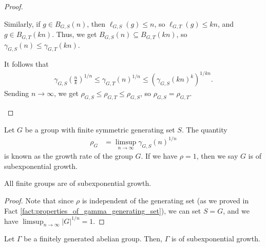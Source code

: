 \documentclass[10pt]{mypackage2}
\begin{document}
\begin{proof}
\begin{enumerate}[(1)]
      Similarly, if $g\in B_{G,S}\left(n\right)$, then $\ell_{G,S}\left(g\right)\leq n$, so $\ell_{G,T}\left(g\right) \leq kn$, and $g\in B_{G,T}\left(kn\right)$. Thus, we get $B_{G,S}\left(n\right)\subseteq B_{G,T}\left(kn\right)$, so $\gamma_{G,S}\left(n\right)\leq \gamma_{G,T}\left(kn\right)$.\newline

      It follows that
      \begin{align*}
        \gamma_{G,S}\left(\frac{n}{k}\right)^{1/n} \leq \gamma_{G,T}\left(n\right)^{1/n} \leq \left(\gamma_{G,S}\left(kn\right)^{k}\right)^{1/kn}.
      \end{align*}
      Sending $n\rightarrow\infty$, we get $\rho_{G,S}\leq \rho_{G,T}\leq \rho_{G,S}$, so $\rho_{G,S} = \rho_{G,T}$.
  \end{enumerate}
\end{proof}
\begin{definition}
  Let $G$ be a group with finite symmetric generating set $S$. The quantity
  \begin{align*}
    \rho_{G} &= \limsup_{n\rightarrow\infty}\gamma_{G,S}\left(n\right)^{1/n}
  \end{align*}
  is known as the growth rate of the group $G$. If we have $\rho = 1$, then we say $G$ is of subexponential growth.
\end{definition}
\begin{fact}\label{fact:finite_groups_subexponential_growth}
  All finite groups are of subexponential growth.
\end{fact}
\begin{proof}
Note that since $\rho$ is independent of the generating set (as we proved in Fact \ref{fact:properties_of_gamma_generating_set}), we can set $S = G$, and we have $\limsup_{n\rightarrow\infty} \left\vert G \right\vert^{1/n} = 1$.
\end{proof}
\begin{fact}\label{fact:finitely_generated_abelian_groups_subexponential_growth}
  Let $\Gamma$ be a finitely generated abelian group. Then, $\Gamma$ is of subexponential growth.
\end{fact}
\end{document}

